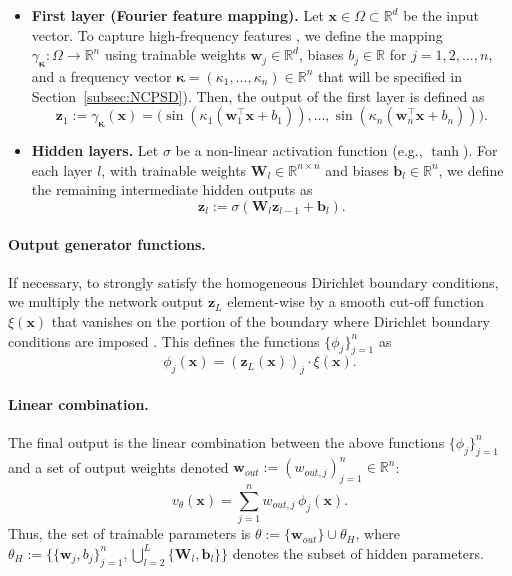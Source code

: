 \documentclass{article}
\theoremstyle{definition}
\begin{document}
\begin{itemize}
    \item[\textbf{A)}] \textbf{First layer (Fourier feature mapping).} Let $\mathbf{x} \in \Omega \subset \mathbb{R}^d$ be the input vector.  To capture high-frequency features \cite{tancik2020fourier}, we define the mapping $\gamma_{\boldsymbol{\kappa}}: \Omega \to \mathbb{R}^n$ using trainable weights $\mathbf{w}_j \in \mathbb{R}^d$, biases $b_j \in \mathbb{R}$ for $j=1,2,...,n$, and a frequency vector $\boldsymbol{\kappa}=(\kappa_1,...,\kappa_n) \in \mathbb{R}^n$ that will be specified in Section~\ref{subsec:NCPSD}). Then, the output of the first layer is defined as
    \begin{equation}
        \mathbf{z}_1 := \gamma_{\boldsymbol{\kappa}}(\mathbf{x}) = \big( 
        \sin(\kappa_1 (\mathbf{w}_1^\top \mathbf{x} + b_1)), \dots,
        \sin(\kappa_n (\mathbf{w}_n^\top \mathbf{x} + b_n)) \big).
    \end{equation}
    
    \item[\textbf{B)}] \textbf{Hidden layers.} Let $\sigma$ be a non-linear activation function (e.g., $\tanh$). For each layer $l$, with trainable weights $\mathbf{W}_l \in \mathbb{R}^{n \times n}$ and biases $\mathbf{b}_l \in \mathbb{R}^n$, we define the remaining intermediate hidden outputs as
    \begin{equation}
        \mathbf{z}_l := \sigma(\mathbf{W}_l \mathbf{z}_{l-1} + \mathbf{b}_l).
    \end{equation}
\end{itemize}

\paragraph{Output generator functions.} If necessary, to strongly satisfy the homogeneous Dirichlet boundary conditions, we multiply the network output $\mathbf{z}_L$ element-wise by a smooth cut-off function $\xi(\mathbf{x})$ that vanishes on the portion of the boundary where Dirichlet boundary conditions are imposed \cite{BerronePintore2023Enforcing}. This defines the functions $\{\phi_j\}_{j=1}^n$ as
\begin{equation}
    \phi_j(\mathbf{x}) = (\mathbf{z}_L(\mathbf{x}))_j \cdot \xi(\mathbf{x}).
\end{equation}

\paragraph{Linear combination.}
The final output is the linear combination between the above functions $\{\phi_j\}_{j=1}^n$ and a set of output weights denoted $\mathbf{w}_{out} := (w_{out, j})_{j=1}^n \in \mathbb{R}^n$:
\begin{equation}
    v_\theta(\mathbf{x}) = \sum_{j=1}^n w_{out, j} \, \phi_j(\mathbf{x}).
\end{equation}
Thus, the set of trainable parameters is $\theta:=\{ \mathbf{w}_{out} \} \cup \theta_H$, where $\theta_H := \{ \{\mathbf{w}_j, b_j \}_{j=1}^n , \bigcup_{l=2}^L \{ \mathbf{W}_l, \mathbf{b}_l \} \}$ denotes the subset of hidden parameters.
\end{document}
